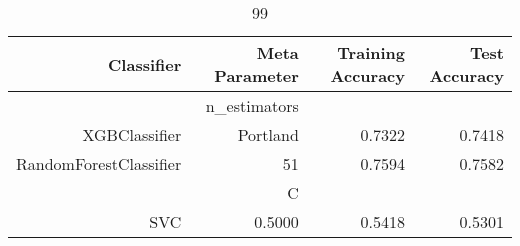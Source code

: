 
\begin{table}[H]
    \caption{99}
    \centering
    \begin{tabular}{|r|r|r|r|}
        \hline
        Classifier &Meta Parameter &Training Accuracy
        &Test Accuracy\\
        \hline
        &n\_estimators &\multicolumn{2}{|r|}{}\\
        \hline
        XGBClassifier &Portland &0.7322 &0.7418\\
        \hline
        RandomForestClassifier &51 &0.7594 &0.7582\\
        \hline
        &C &\multicolumn{2}{|r|}{}\\
        \hline
        SVC &0.5000 &0.5418 &0.5301\\
        \hline
    \end{tabular}
\end{table}
